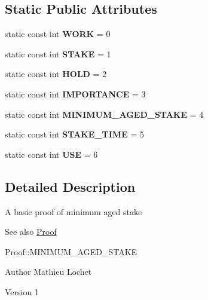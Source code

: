 \subsection*{Static Public Attributes}
\begin{DoxyCompactItemize}
\item 
\mbox{\label{classProof_a457d231986439ee6bcc945daacfc28fc}} 
static const int {\bfseries W\+O\+RK} = 0
\item 
\mbox{\label{classProof_acf157976c3c86ef2fd0e838b8c4ac992}} 
static const int {\bfseries S\+T\+A\+KE} = 1
\item 
\mbox{\label{classProof_ae5c2a86640bf558ff5625157e23b3eec}} 
static const int {\bfseries H\+O\+LD} = 2
\item 
\mbox{\label{classProof_a4e71a5e5928900794353acdd169ca652}} 
static const int {\bfseries I\+M\+P\+O\+R\+T\+A\+N\+CE} = 3
\item 
\mbox{\label{classProof_a1a08ffc465f4fcfde396d4c4feb22eb0}} 
static const int {\bfseries M\+I\+N\+I\+M\+U\+M\+\_\+\+A\+G\+E\+D\+\_\+\+S\+T\+A\+KE} = 4
\item 
\mbox{\label{classProof_a1aa2cb91c5be4ca021714ff6fc01da4a}} 
static const int {\bfseries S\+T\+A\+K\+E\+\_\+\+T\+I\+ME} = 5
\item 
\mbox{\label{classProof_a3f6898fa1d652d32182c3c387c8e979c}} 
static const int {\bfseries U\+SE} = 6
\end{DoxyCompactItemize}


\subsection{Detailed Description}
A basic proof of minimum aged stake \begin{DoxySeeAlso}{See also}
\mbox{\hyperlink{classProof}{Proof}} 

Proof\+::\+M\+I\+N\+I\+M\+U\+M\+\_\+\+A\+G\+E\+D\+\_\+\+S\+T\+A\+KE
\end{DoxySeeAlso}
\begin{DoxyAuthor}{Author}
Mathieu Lochet 
\end{DoxyAuthor}
\begin{DoxyVersion}{Version}
1 
\end{DoxyVersion}


